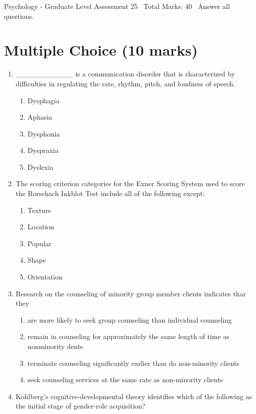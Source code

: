 \documentclass[12pt]{article}
\begin{document}
\begin{center}
Psychology - Graduate Level Assessment 25 \
Total Marks: 40 \
Answer all questions.
\end{center}

\section*{Multiple Choice (10 marks)}
\begin{enumerate}[label=\arabic*.]
\item \_\_\_\_\_\_\_\_\_\_\_ is a communication disorder that is characterized by difficulties in regulating the rate, rhythm, pitch, and loudness of speech.
\begin{enumerate}[label=(\alph*)]
    \item Dysphagia
    \item Aphasia
    \item Dysphonia
    \item Dyspraxia
    \item Dyslexia
\end{enumerate}
\item The scoring criterion categories for the Exner Scoring System used to score the Rorschach Inkblot Test include all of the following except:
\begin{enumerate}[label=(\alph*)]
    \item Texture
    \item Location
    \item Popular
    \item Shape
    \item Orientation
\end{enumerate}
\item Research on the counseling of minority group member clients indicates thar they
\begin{enumerate}[label=(\alph*)]
    \item are more likely to seek group counseling than individual counseling
    \item remain in counseling for approximately the same length of time as nonminority dents
    \item terminate counseling significantly earlier than do non-minority clients
    \item seek counseling services at the same rate as non-minority clients
\end{enumerate}
\item Kohlberg's cognitive-developmental theory identifies which of the following as the initial stage of gender-role acquisition?

\end{enumerate}
\end{document}
